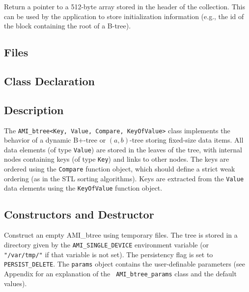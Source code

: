 	 {Return a pointer to a 512-byte array
	stored in the header of the collection. This can be used by the
	application to store initialization information (e.g., the id of
	the block containing the root of a B-tree).}

   \etabb
{}



\subsection{Files}
\btabb
    {}
\etabb

\subsection{Class Declaration}

\btabb
    {}
\etabb

\subsection{Description}

The {\tt AMI\_btree<Key, Value, Compare, KeyOfValue>} class implements the
behavior of a dynamic B+-tree or $(a,b)$-tree storing fixed-size data
items. All data elements (of type {\tt Value}) are stored in the leaves of
the tree, with internal nodes containing keys (of type {\tt Key}) and links
to other nodes. The keys are ordered using the {\tt Compare} function
object, which should define a strict weak ordering (as in the STL sorting
algorithms). Keys are extracted from the {\tt Value} data elements using
the {\tt KeyOfValue} function object.

\subsection{Constructors and Destructor}

\btabb

   {Construct an empty AMI\_btree using temporary files. The tree is stored in a
   directory given by the {\tt AMI\_SINGLE\_DEVICE} environment variable (or {\tt
   "/var/tmp/"} if that variable is not set). The persistency flag is set to
   {\tt PERSIST\_DELETE}. The {\tt params} object contains the
   user-definable parameters (see Appendix for an explanation of the {\tt
   AMI\_btree\_params} class and the default values).}

